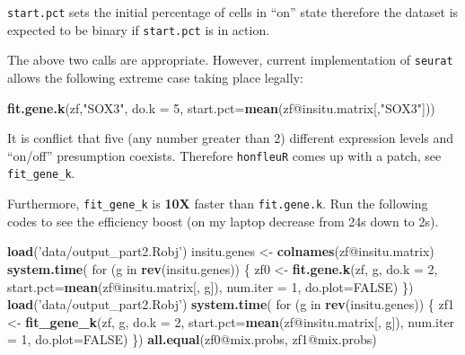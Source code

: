 \documentclass[]{article}
\newenvironment{Shaded}{\begin{snugshade}}{\end{snugshade}}
\newcommand{\KeywordTok}[1]{\textcolor[rgb]{0.13,0.29,0.53}{\textbf{{#1}}}}
\newcommand{\DataTypeTok}[1]{\textcolor[rgb]{0.13,0.29,0.53}{{#1}}}
\newcommand{\DecValTok}[1]{\textcolor[rgb]{0.00,0.00,0.81}{{#1}}}
\newcommand{\StringTok}[1]{\textcolor[rgb]{0.31,0.60,0.02}{{#1}}}
\newcommand{\OtherTok}[1]{\textcolor[rgb]{0.56,0.35,0.01}{{#1}}}
\newcommand{\NormalTok}[1]{{#1}}
\begin{document}
\texttt{start.pct} sets the initial percentage of cells in ``on'' state
therefore the dataset is expected to be binary if \texttt{start.pct} is
in action.

The above two calls are appropriate. However, current implementation of
\texttt{seurat} allows the following extreme case taking place legally:

\begin{Shaded}
\begin{Highlighting}[]
\KeywordTok{fit.gene.k}\NormalTok{(zf,}\StringTok{"SOX3"}\NormalTok{, }\DataTypeTok{do.k =} \DecValTok{5}\NormalTok{, }\DataTypeTok{start.pct=}\KeywordTok{mean}\NormalTok{(zf@insitu.matrix[,}\StringTok{"SOX3"}\NormalTok{]))}
\end{Highlighting}
\end{Shaded}

It is conflict that five (any number greater than 2) different
expression levels and ``on/off'' presumption coexists. Therefore
\texttt{honfleuR} comes up with a patch, see \texttt{fit\_gene\_k}.

Furthermore, \texttt{fit\_gene\_k} is \textbf{10X} faster than
\texttt{fit.gene.k}. Run the following codes to see the efficiency boost
(on my laptop decrease from 24s down to 2s).

\begin{Shaded}
\begin{Highlighting}[]
\KeywordTok{load}\NormalTok{(}\StringTok{'data/output_part2.Robj'}\NormalTok{)}
\NormalTok{insitu.genes <-}\StringTok{ }\KeywordTok{colnames}\NormalTok{(zf@insitu.matrix)}
\KeywordTok{system.time}\NormalTok{(}
  \NormalTok{for (g in }\KeywordTok{rev}\NormalTok{(insitu.genes)) \{}
    \NormalTok{zf0 <-}\StringTok{ }\KeywordTok{fit.gene.k}\NormalTok{(zf, g, }\DataTypeTok{do.k =} \DecValTok{2}\NormalTok{, }\DataTypeTok{start.pct=}\KeywordTok{mean}\NormalTok{(zf@insitu.matrix[, g]),}
                      \DataTypeTok{num.iter =} \DecValTok{1}\NormalTok{, }\DataTypeTok{do.plot=}\OtherTok{FALSE}\NormalTok{)}
  \NormalTok{\})}
\KeywordTok{load}\NormalTok{(}\StringTok{'data/output_part2.Robj'}\NormalTok{)}
\KeywordTok{system.time}\NormalTok{(}
  \NormalTok{for (g in }\KeywordTok{rev}\NormalTok{(insitu.genes)) \{}
    \NormalTok{zf1 <-}\StringTok{ }\KeywordTok{fit_gene_k}\NormalTok{(zf, g, }\DataTypeTok{do.k =} \DecValTok{2}\NormalTok{, }\DataTypeTok{start.pct=}\KeywordTok{mean}\NormalTok{(zf@insitu.matrix[, g]),}
                      \DataTypeTok{num.iter =} \DecValTok{1}\NormalTok{, }\DataTypeTok{do.plot=}\OtherTok{FALSE}\NormalTok{)}
  \NormalTok{\})}
\KeywordTok{all.equal}\NormalTok{(zf0@mix.probs, zf1@mix.probs)}
\end{Highlighting}
\end{Shaded}
\end{document}
